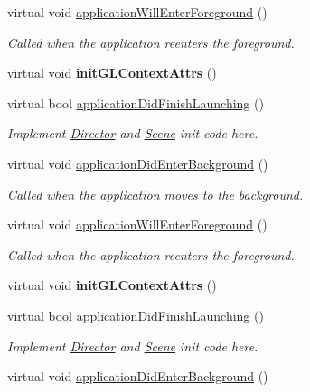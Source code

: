 \begin{DoxyCompactItemize}
virtual void \hyperlink{classAppDelegate_a3d566ef257a887953201bf8fe44de8a4}{application\+Will\+Enter\+Foreground} ()
\begin{DoxyCompactList}\small\item\em Called when the application reenters the foreground. \end{DoxyCompactList}\item 
\mbox{\label{classAppDelegate_a8cebb62f1a76c1b912cf654ee49a7455}} 
virtual void {\bfseries init\+G\+L\+Context\+Attrs} ()
\item 
virtual bool \hyperlink{classAppDelegate_a05630e4484204b8e917ae7b8ac4bd6a3}{application\+Did\+Finish\+Launching} ()
\begin{DoxyCompactList}\small\item\em Implement \hyperlink{classDirector}{Director} and \hyperlink{classScene}{Scene} init code here. \end{DoxyCompactList}\item 
virtual void \hyperlink{classAppDelegate_a852ad7535f0df46885c2a36d3f17a0e8}{application\+Did\+Enter\+Background} ()
\begin{DoxyCompactList}\small\item\em Called when the application moves to the background. \end{DoxyCompactList}\item 
virtual void \hyperlink{classAppDelegate_a3d566ef257a887953201bf8fe44de8a4}{application\+Will\+Enter\+Foreground} ()
\begin{DoxyCompactList}\small\item\em Called when the application reenters the foreground. \end{DoxyCompactList}\item 
\mbox{\label{classAppDelegate_a8cebb62f1a76c1b912cf654ee49a7455}} 
virtual void {\bfseries init\+G\+L\+Context\+Attrs} ()
\item 
virtual bool \hyperlink{classAppDelegate_a05630e4484204b8e917ae7b8ac4bd6a3}{application\+Did\+Finish\+Launching} ()
\begin{DoxyCompactList}\small\item\em Implement \hyperlink{classDirector}{Director} and \hyperlink{classScene}{Scene} init code here. \end{DoxyCompactList}\item 
virtual void \hyperlink{classAppDelegate_a852ad7535f0df46885c2a36d3f17a0e8}{application\+Did\+Enter\+Background} ()

\end{DoxyCompactItemize}
